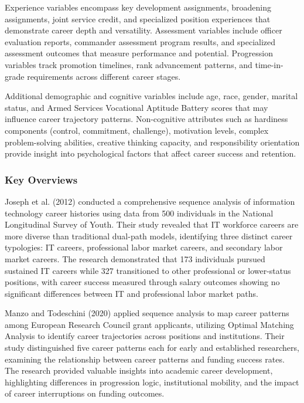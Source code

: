 \documentclass[main.tex]{subfiles}
\begin{document}
Experience variables encompass key development assignments, broadening assignments, joint service credit, and specialized position experiences that demonstrate career depth and versatility. Assessment variables include officer evaluation reports, commander assessment program results, and specialized assessment outcomes that measure performance and potential. Progression variables track promotion timelines, rank advancement patterns, and time-in-grade requirements across different career stages\cite{potential2024}.

Additional demographic and cognitive variables include age, race, gender, marital status, and Armed Services Vocational Aptitude Battery scores that may influence career trajectory patterns. Non-cognitive attributes such as hardiness components (control, commitment, challenge), motivation levels, complex problem-solving abilities, creative thinking capacity, and responsibility orientation provide insight into psychological factors that affect career success and retention\cite{potential2024}.

\subsubsection{Key Overviews}

Joseph et al. (2012) conducted a comprehensive sequence analysis of information technology career histories using data from 500 individuals in the National Longitudinal Survey of Youth. Their study revealed that IT workforce careers are more diverse than traditional dual-path models, identifying three distinct career typologies: IT careers, professional labor market careers, and secondary labor market careers. The research demonstrated that 173 individuals pursued sustained IT careers while 327 transitioned to other professional or lower-status positions, with career success measured through salary outcomes showing no significant differences between IT and professional labor market paths\cite{joseph2012}.

Manzo and Todeschini (2020) applied sequence analysis to map career patterns among European Research Council grant applicants, utilizing Optimal Matching Analysis to identify career trajectories across positions and institutions. Their study distinguished five career patterns each for early and established researchers, examining the relationship between career patterns and funding success rates. The research provided valuable insights into academic career development, highlighting differences in progression logic, institutional mobility, and the impact of career interruptions on funding outcomes\cite{manzo2020}.
\end{document}
